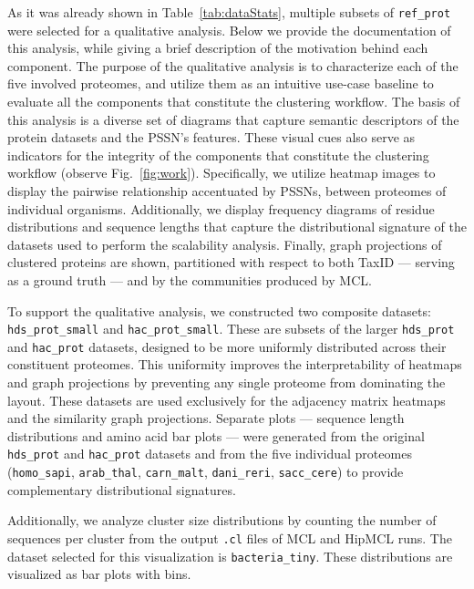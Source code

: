 As it was already shown in Table~\ref{tab:dataStats}, multiple subsets of
\texttt{ref\_prot} were selected for a qualitative analysis. Below we provide
the documentation of this analysis, while giving a brief description of the
motivation behind each component. The purpose of the qualitative analysis is to
characterize each of the five involved proteomes, and utilize them
as an intuitive use-case baseline to evaluate all the components that
constitute the clustering workflow. The basis of this analysis is a diverse set
of diagrams that capture semantic descriptors of the protein datasets and the
PSSN's features. These visual cues also serve as indicators for the integrity
of the components that constitute the clustering workflow (observe
Fig.~\ref{fig:work}). Specifically, we utilize heatmap images to display the
pairwise relationship accentuated by PSSNs, between proteomes of individual
organisms. Additionally, we display frequency diagrams of residue distributions
and sequence lengths that capture the distributional signature of the datasets
used to perform the scalability analysis. Finally, graph projections of
clustered proteins are shown, partitioned with respect to both TaxID ---
serving as a ground truth --- and by the communities produced by MCL.

To support the qualitative analysis, we constructed two composite
datasets: \texttt{hds\_prot\_small} and \texttt{hac\_prot\_small}. These are
subsets of the larger \texttt{hds\_prot} and \texttt{hac\_prot} datasets,
designed to be more uniformly distributed across their constituent proteomes.
This uniformity improves the interpretability of heatmaps and graph projections
by preventing any single proteome from dominating the layout. These datasets
are used exclusively for the adjacency matrix heatmaps and the similarity graph
projections. Separate plots --- sequence length distributions and amino acid bar
plots --- were generated from the original \texttt{hds\_prot} and
\texttt{hac\_prot} datasets and from the five individual proteomes
(\texttt{homo\_sapi}, \texttt{arab\_thal}, \texttt{carn\_malt},
\texttt{dani\_reri}, \texttt{sacc\_cere}) to provide complementary distributional
signatures.

Additionally, we analyze cluster size distributions by counting the number of
sequences per cluster from the output \texttt{.cl} files of MCL and HipMCL
runs. The dataset selected for this visualization is \texttt{bacteria\_tiny}.
These distributions are visualized as bar plots with bins.

